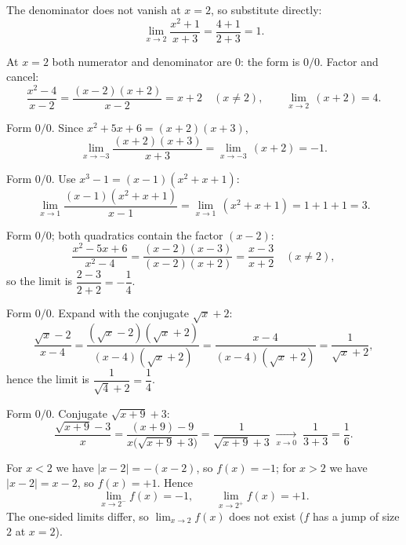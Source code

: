 \begin{solutions}
  \item The denominator does not vanish at $x=2$, so substitute
        directly:
        \[
          \lim_{x\to 2}\frac{x^{2}+1}{x+3}=\frac{4+1}{2+3}=1 .
        \]

  \item At $x=2$ both numerator and denominator are $0$: the form is
        $0/0$. Factor and cancel:
        \[
          \frac{x^{2}-4}{x-2}=\frac{(x-2)(x+2)}{x-2}=x+2
          \quad (x\neq 2),
          \qquad
          \lim_{x\to 2}\,(x+2)=4 .
        \]

  \item Form $0/0$. Since $x^{2}+5x+6=(x+2)(x+3)$,
        \[
          \lim_{x\to -3}\frac{(x+2)(x+3)}{x+3}
          =\lim_{x\to -3}\,(x+2)=-1 .
        \]

  \item Form $0/0$. Use $x^{3}-1=(x-1)(x^{2}+x+1)$:
        \[
          \lim_{x\to 1}\frac{(x-1)(x^{2}+x+1)}{x-1}
          =\lim_{x\to 1}\,(x^{2}+x+1)=1+1+1=3 .
        \]

  \item Form $0/0$; both quadratics contain the factor $(x-2)$:
        \[
          \frac{x^{2}-5x+6}{x^{2}-4}
          =\frac{(x-2)(x-3)}{(x-2)(x+2)}
          =\frac{x-3}{x+2}
          \quad (x\neq 2),
        \]
        so the limit is $\dfrac{2-3}{2+2}=-\dfrac{1}{4}$.

  \item Form $0/0$. Expand with the conjugate $\sqrt{x}+2$:
        \[
          \frac{\sqrt{x}-2}{x-4}
          =\frac{(\sqrt{x}-2)(\sqrt{x}+2)}{(x-4)(\sqrt{x}+2)}
          =\frac{x-4}{(x-4)(\sqrt{x}+2)}
          =\frac{1}{\sqrt{x}+2},
        \]
        hence the limit is $\dfrac{1}{\sqrt{4}+2}=\dfrac{1}{4}$.

  \item Form $0/0$. Conjugate $\sqrt{x+9}+3$:
        \[
          \frac{\sqrt{x+9}-3}{x}
          =\frac{(x+9)-9}{x\bigl(\sqrt{x+9}+3\bigr)}
          =\frac{1}{\sqrt{x+9}+3}
          \;\xrightarrow[x\to 0]{}\;
          \frac{1}{3+3}=\frac{1}{6} .
        \]

  \item For $x<2$ we have $|x-2|=-(x-2)$, so $f(x)=-1$; for $x>2$ we
        have $|x-2|=x-2$, so $f(x)=+1$. Hence
        \[
          \lim_{x\to 2^{-}}f(x)=-1,
          \qquad
          \lim_{x\to 2^{+}}f(x)=+1 .
        \]
        The one-sided limits differ, so $\lim_{x\to 2}f(x)$ does not
        exist ($f$ has a jump of size $2$ at $x=2$).


\end{solutions}
